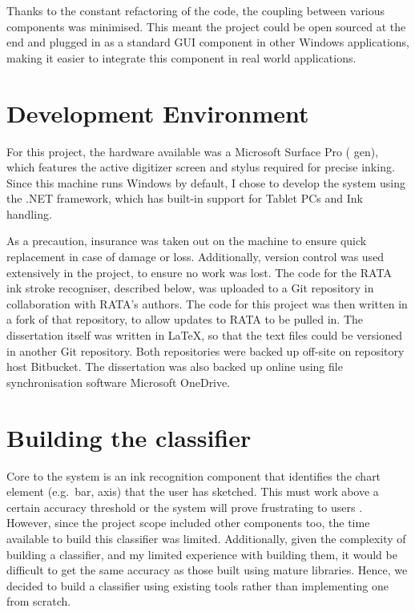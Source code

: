 	Thanks to the constant refactoring of the code, the coupling between various components was minimised. This meant the project could be open sourced at the end and plugged in as a standard GUI component in other Windows applications, making it easier to integrate this component in real world applications.
	
	
	\section{Development Environment}
	For this project, the hardware available was a Microsoft Surface Pro ( gen), which features the active digitizer screen and stylus required for precise inking. Since this machine runs Windows by default, I chose to develop the system using the .NET framework, which has built-in support for Tablet PCs and Ink handling.
	
	As a precaution, insurance was taken out on the machine to ensure quick replacement in case of damage or loss. Additionally, version control was used extensively in the project, to ensure no work was lost. The code for the RATA ink stroke recogniser, described below, was uploaded to a Git repository in collaboration with RATA's authors. The code for this project was then written in a fork of that repository, to allow updates to RATA to be pulled in. The dissertation itself was written in \LaTeX , so that the text files could be versioned in another Git repository. Both repositories were backed up off-site on repository host Bitbucket. The dissertation was also backed up online using file synchronisation software Microsoft OneDrive. 
	
	\section{Building the classifier}	
	Core to the system is an ink recognition component that identifies the chart element (e.g.\ bar, axis) that the user has sketched. This must work above a certain accuracy threshold or the system will prove frustrating to users \citep{frankish_recognition_1995}. However, since the project scope included other components too, the time available to build this classifier was limited. Additionally, given the complexity of building a classifier, and my limited experience with building them, it would be difficult to get the same accuracy as those built using mature libraries. Hence, we decided to build a classifier using existing tools rather than implementing one from scratch. 
	
